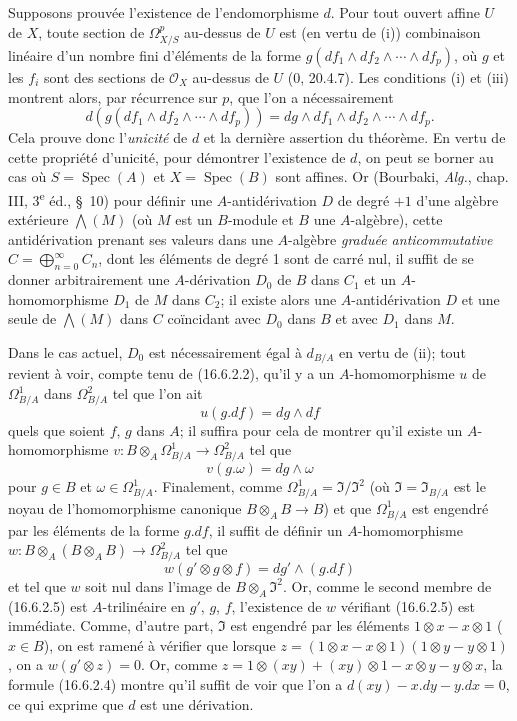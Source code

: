 Supposons prouvée l'existence de l'endomorphisme $d$. Pour tout ouvert affine
$U$ de $X$, toute section de $\Omega_{X/S}^p$ au-dessus de $U$ est (en vertu
de (i)) combinaison linéaire d'un nombre fini d'éléments de la forme
$g(df_1\wedge df_2\wedge\cdots\wedge df_p)$, où $g$ et les $f_i$ sont des
sections de $\mathcal{O}_X$ au-dessus de $U$ (0, 20.4.7). Les conditions (i)
et (iii) montrent alors, par récurrence sur $p$, que l'on a nécessairement
\[
  d(g(df_1\wedge df_2\wedge\cdots\wedge df_p))
  =dg\wedge df_1\wedge df_2\wedge\cdots\wedge df_p.
  \tag{16.6.2.2}
  \label{IV.16.6.2.2}
\]
Cela prouve donc l'\emph{unicité} de $d$ et la dernière assertion du théorème.
En vertu de cette propriété d'unicité, pour démontrer l'existence de $d$, on
peut se borner au cas où $S=\operatorname{Spec}(A)$ et
$X=\operatorname{Spec}(B)$ sont affines. Or (Bourbaki, \emph{Alg.}, chap.
III, 3\textsuperscript{e} éd., \S~10) pour définir une $A$-antidérivation
$D$ de degré $+1$ d'une algèbre extérieure $\bigwedge(M)$ (où $M$ est un
$B$-module et $B$ une $A$-algèbre), cette antidérivation prenant ses valeurs
dans une $A$-algèbre \emph{graduée anticommutative}
$C=\bigoplus_{n=0}^{\infty}C_n$, dont les éléments de degré 1 sont de carré
nul, il suffit de se donner arbitrairement une $A$-dérivation $D_0$ de $B$
dans $C_1$ et un $A$-homomorphisme $D_1$ de $M$ dans $C_2$; il existe alors
une $A$-antidérivation $D$ et une seule de $\bigwedge(M)$ dans $C$
coïncidant avec $D_0$ dans $B$ et avec $D_1$ dans $M$.

Dans le cas actuel, $D_0$ est nécessairement égal à $d_{B/A}$ en vertu de
(ii); tout revient à voir, compte tenu de (16.6.2.2), qu'il y a un
$A$-homomorphisme $u$ de $\Omega_{B/A}^1$ dans $\Omega_{B/A}^2$ tel que
l'on ait
\[
  u(g.df)=dg\wedge df
  \tag{16.6.2.3}
  \label{IV.16.6.2.3}
\]
quels que soient $f$, $g$ dans $A$; il suffira pour cela de montrer qu'il
existe un $A$-homomorphisme
$v:B\otimes_A\Omega_{B/A}^1\to\Omega_{B/A}^2$ tel que
\[
  v(g.\omega)=dg\wedge\omega
  \tag{16.6.2.4}
  \label{IV.16.6.2.4}
\]
pour $g\in B$ et $\omega\in\Omega_{B/A}^1$. Finalement, comme
$\Omega_{B/A}^1=\mathfrak{I}/\mathfrak{I}^2$ (où
$\mathfrak{I}=\mathfrak{I}_{B/A}$ est le noyau de l'homomorphisme canonique
$B\otimes_A B\to B$) et que $\Omega_{B/A}^1$ est engendré par les éléments
de la forme $g.df$, il suffit de définir un $A$-homomorphisme
$w:B\otimes_A(B\otimes_A B)\to\Omega_{B/A}^2$ tel que
\[
  w(g'\otimes g\otimes f)=dg'\wedge(g.df)
  \tag{16.6.2.5}
  \label{IV.16.6.2.5}
\]
et tel que $w$ soit nul dans l'image de $B\otimes_A\mathfrak{I}^2$. Or,
comme le second membre de (16.6.2.5) est $A$-trilinéaire en $g'$, $g$, $f$,
l'existence de $w$ vérifiant (16.6.2.5) est immédiate. Comme, d'autre part,
$\mathfrak{I}$ est engendré par les éléments $1\otimes x-x\otimes1$
($x\in B$), on est ramené à vérifier que lorsque
$z=(1\otimes x-x\otimes1)(1\otimes y-y\otimes1)$, on a
$w(g'\otimes z)=0$. Or, comme
$z=1\otimes(xy)+(xy)\otimes1-x\otimes y-y\otimes x$, la formule (16.6.2.4)
montre qu'il
suffit de voir que l'on a $d(xy)-x.dy-y.dx=0$, ce qui exprime que $d$ est une
dérivation.

